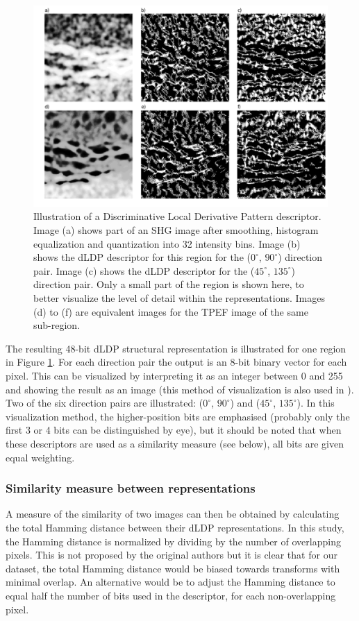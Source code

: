 \documentclass{report}
\begin{document}
\begin{figure}
\centering
\includegraphics[width=5.5in]{LDP_visualization_zoomin.pdf}
\caption{Illustration of a Discriminative Local Derivative Pattern descriptor. Image (a) shows part of an SHG image after smoothing, histogram equalization and quantization into 32 intensity bins. Image (b) shows the dLDP descriptor for this region for the ($0^{\circ}$, $90^{\circ}$) direction pair. Image (c) shows the dLDP descriptor for the ($45^{\circ}$, $135^{\circ}$) direction pair. Only a small part of the region is shown here, to better visualize the level of detail within the representations. Images (d) to (f) are equivalent images for the TPEF image of the same sub-region.}
\label{fig:dLDP_vis}
\end{figure}
The resulting 48-bit dLDP structural representation is illustrated for one region in Figure \ref{fig:dLDP_vis}. For each direction pair the output is an 8-bit binary vector for each pixel. This can be visualized by interpreting it as an integer between 0 and 255 and showing the result as an image (this method of visualization is also used in \cite{jiang2017fast}). Two of the six direction pairs are illustrated: ($0^{\circ}$, $90^{\circ}$) and ($45^{\circ}$, $135^{\circ}$). In this visualization method, the higher-position bits are emphasised (probably only the first 3 or 4 bits can be distinguished by eye), but it should be noted that when these descriptors are used as a similarity measure (see below), all bits are given equal weighting.

\subsubsection{Similarity measure between representations}
A measure of the similarity of two images can then be obtained by calculating the total Hamming distance between their dLDP representations. In this study, the Hamming distance is normalized by dividing by the number of overlapping pixels. This is not proposed by the original authors but it is clear that for our dataset, the total Hamming distance would be biased towards transforms with minimal overlap. An alternative would be to adjust the Hamming distance to equal half the number of bits used in the descriptor, for each non-overlapping pixel. 
\end{document}
